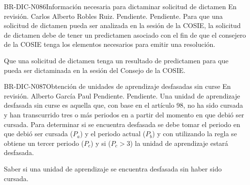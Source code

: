 \begin{BusinessRule}{BR-DIC-N086}{Información necesaria para dictaminar solicitud de dictamen}
	{\bcDerivation} %
	{\btTimer}     %
	{\blInfluencing}     %
	\BRItem[Estado] En revisión.
	 Carlos Alberto Robles Ruiz.
	 Pendiente.
	 Pendiente.
	\BRItem[Descripción] Para que una solicitud de dictamen pueda ser analizada en la sesión de la COSIE, la solicitud de dictamen debe de tener un predictamen asociado con el fin de que el consejero de la COSIE tenga los elementos necesarios para emitir una resolución.
	\BRItem[Sentencia] \cdtEmpty
	
	\BRItem[Motivación] Que una solicitud de dictamen tenga un resultado de predictamen para que pueda ser dictaminada en la sesión del Consejo de la COSIE.
\end{BusinessRule}

\begin{BusinessRule}{BR-DIC-N087}{Obtención de unidades de aprendizaje desfasadas sin curse}
	{\bcDerivation} %
	{\btTimer}     %
	{\blInfluencing}     %
	\BRItem[Estado] En revisión.
	 Alberto García Paul
	 Pendiente.
	 Pendiente.
	\BRItem[Descripción] Una unidad de aprendizaje desfasada sin curse es aquella que, con base en el artículo 98, no ha sido cursada y han transcurrido tres o más periodos en a partir del momento en que debió ser cursada. Para determinar si se encuentra desfasada se debe tomar el periodo en que debió ser cursada ($P_{a}$) y el periodo actual ($P_{b}$) y con utilizando la regla  se obtiene un tercer periodo ($P_{c}$) y si ($P_{c} > 3$) la unidad de aprendizaje estará desfasada.
	\BRItem[Sentencia] \cdtEmpty
	
	\BRItem[Motivación] Saber si una unidad de aprendizaje se encuentra desfasada sin haber sido cursada.
\end{BusinessRule}


